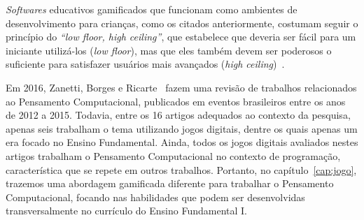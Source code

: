 \textit{Softwares} educativos gamificados que funcionam como ambientes de desenvolvimento para crianças, como os citados anteriormente, costumam seguir o princípio do \textit{“low floor, high ceiling”}, que estabelece que deveria ser fácil para um iniciante utilizá-los (\textit{low floor}), mas que eles também devem ser poderosos o suficiente para satisfazer usuários mais avançados (\textit{high ceiling})~\cite{grover_computational_2013}.

Em 2016, Zanetti, Borges e Ricarte~\cite{zanetti_pensamento_2016} fazem uma revisão de trabalhos relacionados ao Pensamento Computacional, publicados em eventos brasileiros entre os anos de 2012 a 2015. Todavia, entre os 16 artigos adequados ao contexto da pesquisa, apenas seis trabalham o tema utilizando jogos digitais, dentre os quais apenas um era focado no Ensino Fundamental. Ainda, todos os jogos digitais avaliados nestes artigos trabalham o Pensamento Computacional no contexto de programação, característica que se repete em outros trabalhos. Portanto, no capítulo~\ref{cap:jogo}, trazemos uma abordagem gamificada diferente para trabalhar o Pensamento Computacional, focando nas habilidades que podem ser desenvolvidas transversalmente no currículo do Ensino Fundamental I.
